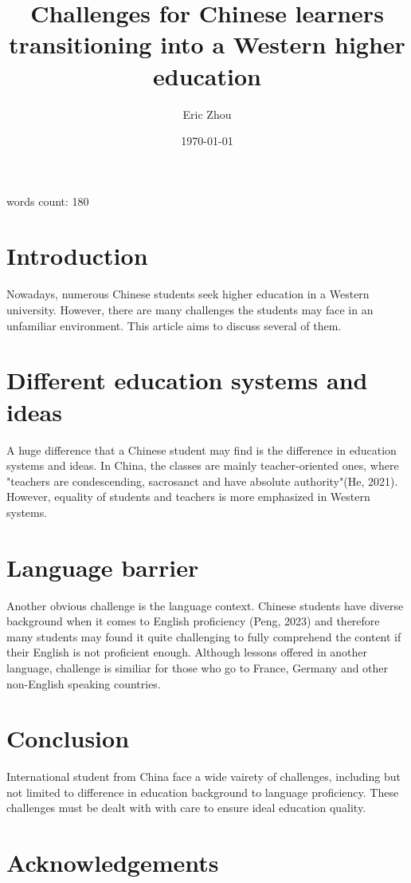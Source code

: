 \documentclass[12pt,a4paper]{article}
\title{\textbf{Challenges for Chinese learners transitioning into a Western higher education}}
\author{Eric Zhou}
\date{\today}
\begin{document}
\maketitle
words count: 180
\tableofcontents
\clearpage

\section{Introduction}

Nowadays, numerous Chinese students seek higher education in a Western university. However, there are many challenges the students may face in an unfamiliar environment. This article aims to discuss several of them.

\section{Different education systems and ideas}

A huge difference that a Chinese student may find is the difference in education systems and ideas. In China, the classes are mainly teacher-oriented ones, where "teachers are condescending, sacrosanct and have absolute authority"(He, 2021). However, equality of students and teachers is more emphasized in Western systems.

\section{Language barrier}

Another obvious challenge is the language context. Chinese students have diverse background when it comes to English proficiency (Peng, 2023) and therefore many students may found it quite challenging to fully comprehend the content if their English is not proficient enough. Although lessons offered in another language, challenge is similiar for those who go to France, Germany and other non-English speaking countries.

\section{Conclusion}

International student from China face a wide vairety of challenges, including but not limited to difference in education background to language proficiency. These challenges must be dealt with with care to ensure ideal education quality.

\section{Acknowledgements}
\end{document}

